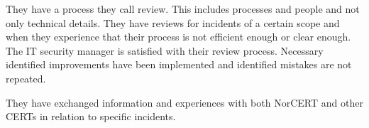They have a process they call review. This includes processes and people and not only technical details. They have reviews for incidents of a certain scope and when they experience that their process is not efficient enough or clear enough. The IT security manager is satisfied with their review process. Necessary identified improvements have been implemented and identified mistakes are not repeated.

They have exchanged information and experiences with both \acs{NorCERT} and other \acp{CERT} in relation to specific incidents.
